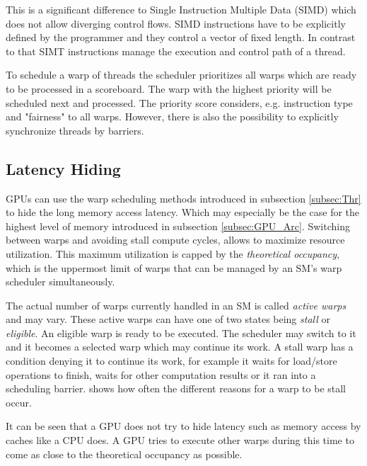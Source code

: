   This is a significant difference to Single Instruction Multiple Data (SIMD) which does not allow diverging control flows.
  SIMD instructions have to be explicitly defined by the programmer and they control a vector of fixed length.
  In contrast to that SIMT instructions manage the execution and control path of a thread.
  
  To schedule a warp of threads the scheduler prioritizes all warps which are ready to be processed in a scoreboard.
  The warp with the highest priority will be scheduled next and processed.
  The priority score considers, e.g. instruction type and "fairness" to all warps.
  However, there is also the possibility to explicitly synchronize threads by barriers.~\cite{Lindholm.2008}

         
\subsection{Latency Hiding}
  GPUs can use the warp scheduling methods introduced in subsection \ref{subsec:Thr} to hide the long memory access latency.
  Which may especially be the case for the highest level of memory introduced in subsection \ref{subsec:GPU_Arc}.
  Switching between warps and avoiding stall compute cycles, allows to maximize resource utilization.
  This maximum utilization is capped by the \textit{theoretical occupancy}, which is the uppermost limit of warps that can be managed by an SM's warp scheduler simultaneously.~\cite{NInsight}
  
  The actual number of warps currently handled in an SM is called \textit{active warps} and may vary.
  These active warps can have one of two states being \textit{stall} or \textit{eligible}.
  An eligible warp is ready to be executed.
  The scheduler may switch to it and it becomes a selected warp which may continue its work.
  A stall warp has a condition denying it to continue its work, for example it waits for load/store operations to finish, waits for other computation results or it ran into a scheduling barrier.
  \cite{NInsight} shows how often the different reasons for a warp to be stall occur.~\cite{NVIDIA.2019}~\cite{volkov.2016}

  It can be seen that a GPU does not try to hide latency such as memory access by caches like a CPU does.
  A GPU tries to execute other warps during this time to come as close to the theoretical occupancy as possible.~\cite{Rauber.2012}
  
